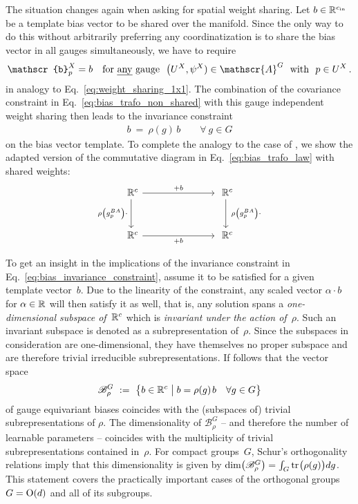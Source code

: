 The situation changes again when asking for spatial weight sharing.
Let $b \in \mathbb{R}^{{c_\textup{in}}}$ be a template bias vector to be shared over the manifold.
Since the only way to do this without arbitrarily preferring any coordinatization is to share the bias vector in all gauges simultaneously, we have to require
\begin{align}
    \mathscr{b}_p^X = b
    \quad \textup{for \emph{any} gauge}\ \ \big(U^X,\psi^X) \in \mathscr{A}^G\ \ \textup{with}\ \ p\in U^X \,.
\end{align}
in analogy to Eq.~\eqref{eq:weight_sharing_1x1}.
The combination of the covariance constraint in Eq.~\eqref{eq:bias_trafo_non_shared} with this gauge independent weight sharing then leads to the invariance constraint
\begin{align}\label{eq:bias_invariance_constraint}
    b\ =\ \rho(g)\, b \qquad \forall\ g\in G
\end{align}
on the bias vector template.
To complete the analogy to the case of \onexones, we show the adapted version of the commutative diagram in Eq.~\eqref{eq:bias_trafo_law} with shared weights:
\begin{equation}
\begin{tikzcd}[column sep=75pt, row sep=30pt, font=\normalsize]
    \R^c
        \arrow[d, "\rho\big( g_p^{BA}\big)\cdot\,"']
        \arrow[r, "+b"]
    &
    \R^c
        \arrow[d, "\ \rho\big( g_p^{BA}\big)\cdot"]
    \\
    \R^c
        \arrow[r, "+b"']
    &
    \R^c
\end{tikzcd}
\end{equation}


To get an insight in the implications of the invariance constraint in Eq.~\eqref{eq:bias_invariance_constraint}, assume it to be satisfied for a given template vector~$b$.
Due to the linearity of the constraint, any scaled vector $\alpha \!\cdot\! b$ for $\alpha\in\mathbb{R}$ will then satisfy it as well, that is, any solution spans a \emph{one-dimensional subspace of~$\mathbb{R}^c$} which is \emph{invariant under the action of~$\rho$}.
Such an invariant subspace is denoted as a subrepresentation of~$\rho$.
Since the subspaces in consideration are one-dimensional, they have themselves no proper subspace and are therefore trivial irreducible subrepresentations.
If follows that the vector space
\begin{align}\label{eq:gauge_bias_solution_space}
    \mathscr{B}^G_\rho\ :=\ \big\{ b \in\mathbb{R}^c \;\big|\; b = \rho(g)\mkern2mu b\ \ \ \forall g\in G \big\}
\end{align}
of gauge equivariant biases coincides with the (subspaces of) trivial subrepresentations of $\rho$.
The dimensionality of $\mathscr{B}^G_\rho$ -- and therefore the number of learnable parameters -- coincides with the multiplicity of trivial subrepresentations contained in~$\rho$.
For compact groups~$G$, Schur's orthogonality relations imply that this dimensionality is given by $\dim\!\big(\mathscr{B}^G_\rho\big) = \int_G \operatorname{tr}\mkern-2mu\big(\rho(g)\big) dg$.
This statement covers the practically important cases of the orthogonal groups $G=\operatorname{O}(d)$ and all of its subgroups.


